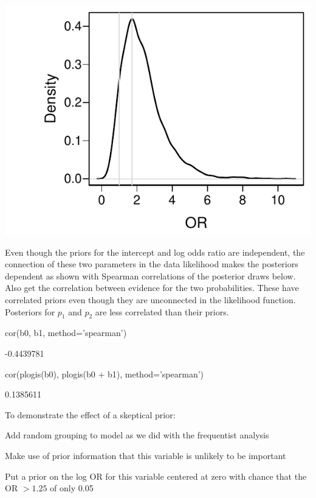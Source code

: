 \begin{Schunk}
\centerline{\includegraphics[width=\maxwidth]{prop-bayesprop4-1} }

\end{Schunk}

Even though the priors for the intercept and log odds ratio are independent, the connection of these two parameters in the data likelihood makes the posteriors dependent as shown with Spearman correlations of the posterior draws below.  Also get the correlation between evidence for the two probabilities.  These have correlated priors even though they are unconnected in the likelihood function.  Posteriors for $p_1$ and $p_2$ are less correlated than their priors.

\begin{Schunk}
\begin{Sinput}
cor(b0, b1, method='spearman')
\end{Sinput}
\begin{Soutput}
[1] -0.4439781
\end{Soutput}
\begin{Sinput}
cor(plogis(b0), plogis(b0 + b1), method='spearman')
\end{Sinput}
\begin{Soutput}
[1] 0.1385611
\end{Soutput}
\end{Schunk}


To demonstrate the effect of a skeptical prior:
\bi
\item Add random grouping to model as we did with the frequentist analysis
\item Make use of prior information that this variable is unlikely to be important
\item Put a prior on the log OR for this variable centered at zero with chance that the OR $> 1.25$ of only 0.05
\ei


